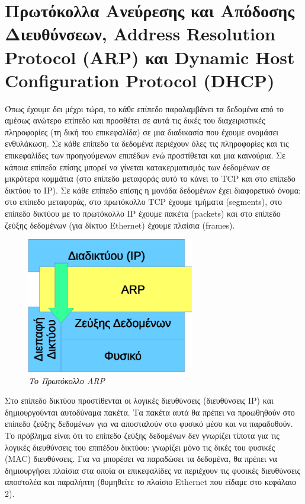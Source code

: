 %
%
\section{Πρωτόκολλα Ανεύρεσης και Απόδοσης Διευθύνσεων, Address Resolution Protocol (ARP) και Dynamic Host Configuration Protocol (DHCP)}

Όπως έχουμε δει μέχρι τώρα, το κάθε επίπεδο παραλαμβάνει τα δεδομένα από το αμέσως ανώτερο επίπεδο και προσθέτει σε αυτά τις δικές του διαχειριστικές πληροφορίες (τη δική του επικεφαλίδα) σε μια διαδικασία που έχουμε ονομάσει ενθυλάκωση. Σε κάθε επίπεδο τα δεδομένα περιέχουν όλες τις πληροφορίες και τις επικεφαλίδες των προηγούμενων επιπέδων ενώ προστίθεται και μια καινούρια. Σε κάποια επίπεδα επίσης μπορεί να γίνεται κατακερματισμός των δεδομένων σε μικρότερα κομμάτια (στο επίπεδο μεταφοράς αυτό το κάνει το TCP και στο επίπεδο δικτύου το IP). Σε κάθε επίπεδο επίσης η μονάδα δεδομένων έχει διαφορετικό όνομα: στο επίπεδο μεταφοράς, στο πρωτόκολλο TCP έχουμε τμήματα (segments), στο επίπεδο δικτύου με το πρωτόκολλο IP έχουμε πακέτα (packets) και στο επίπεδο ζεύξης δεδομένων (για δίκτυο Ethernet) έχουμε πλαίσια (frames). 


\begin{figure}[!ht]
  \centering
  \includegraphics[width=0.65\textwidth]{images/chapter3/3-15}
  \caption {\textsl{Το Πρωτόκολλο ARP}}
  \label{3-15}
\end{figure}


Στο επίπεδο δικτύου προστίθενται οι λογικές διευθύνσεις (διευθύνσεις IP) και δημιουργούνται αυτοδύναμα πακέτα. Τα πακέτα αυτά θα πρέπει να προωθηθούν στο επίπεδο ζεύξης δεδομένων για να αποσταλούν στο φυσικό μέσο και να παραδοθούν. Το πρόβλημα είναι ότι το επίπεδο ζεύξης δεδομένων δεν γνωρίζει τίποτα για τις λογικές διευθύνσεις του επιπέδου δικτύου: γνωρίζει μόνο τις δικές του φυσικές (MAC) διευθύνσεις. Για να μπορέσει να παραδώσει τα δεδομένα, θα πρέπει να δημιουργήσει πλαίσια στα οποία οι επικεφαλίδες να περιέχουν τις φυσικές διευθύνσεις αποστολέα και παραλήπτη (θυμηθείτε το πλαίσιο Ethernet που είδαμε στο κεφάλαιο 2).

